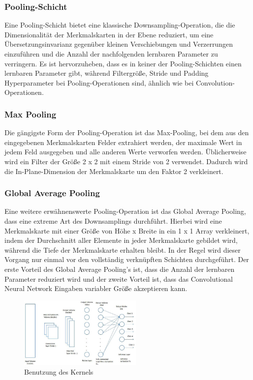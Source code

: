 \documentclass[paper=A4,pagesize=auto,12pt,headinclude=true,footinclude=true,BCOR=0mm,DIV=calc]{scrartcl}
\begin{document}
\subsubsection{Pooling-Schicht}
Eine Pooling-Schicht bietet eine klassische Downsampling-Operation, die die Dimensionalität der Merkmalskarten in der Ebene reduziert, um eine Übersetzungsinvarianz gegenüber kleinen Verschiebungen und Verzerrungen einzuführen und die Anzahl der nachfolgenden lernbaren Parameter zu verringern. Es ist hervorzuheben, dass es in keiner der Pooling-Schichten einen lernbaren Parameter gibt, während Filtergröße, Stride und Padding Hyperparameter bei Pooling-Operationen sind, ähnlich wie bei Convolution-Operationen. \cite{cnn2}

\subsubsection{Max Pooling}
Die gängigste Form der Pooling-Operation ist das Max-Pooling, bei dem aus den eingegebenen Merkmalskarten Felder extrahiert werden, der maximale Wert in jedem Feld ausgegeben und alle anderen Werte verworfen werden. Üblicherweise wird ein Filter der Größe 2 x 2 mit einem Stride von 2 verwendet. Dadurch wird die In-Plane-Dimension der Merkmalskarte um den Faktor 2 verkleinert. \cite{cnn2}

\subsubsection{Global Average Pooling}
Eine weitere erwähnenswerte Pooling-Operation ist das Global Average Pooling, dass eine extreme Art des Downsamplings durchführt. Hierbei wird eine Merkmalskarte mit einer Größe von Höhe x Breite in ein 1 x 1 Array verkleinert, indem der Durchschnitt aller Elemente in jeder Merkmalskarte gebildet wird, während die Tiefe der Merkmalskarte erhalten bleibt. In der Regel wird dieser Vorgang nur einmal vor den vollständig verknüpften Schichten durchgeführt. Der erste Vorteil des Global Average Pooling’s ist, dass die Anzahl der lernbaren Parameter reduziert wird und der zweite Vorteil ist, dass das Convolutional Neural Network Eingaben variabler Größe akzeptieren kann. \cite{cnn2}
\vspace{1cm}
\begin{figure}
	\centering
	\includegraphics[width=6cm]{"images/vollst_verk_schicht.png"}
	\caption{Benutzung des Kernels \cite{cnn1}}
	\label{polyconnected}
\end{figure}
\vspace{-1cm}
\end{document}
